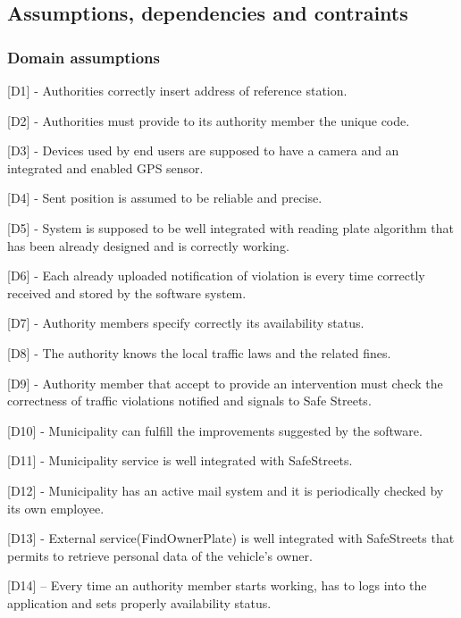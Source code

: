 \documentclass[12pt]{article}
\begin{document}
\subsection{Assumptions, dependencies and contraints}
\vspace{3mm}
\subsubsection{Domain assumptions}
\begin{flushleft}

[D1] - Authorities correctly insert address of reference station.
\vspace{2mm}

[D2] - Authorities must provide to its authority member the unique code.
\vspace{2mm}

[D3] - Devices used by end users are supposed to have a camera and an integrated and enabled GPS sensor.
\vspace{2mm}

[D4] - Sent position is assumed to be reliable and precise.
\vspace{2mm}

[D5] - System is supposed to be well integrated with reading plate algorithm that has been already designed and is correctly working.
\vspace{2mm}

[D6] - Each already uploaded notification of violation is every time correctly received and stored by the software system.
\vspace{2mm}

[D7] - Authority members specify correctly its availability status.
\vspace{2mm}

[D8] - The authority knows the local traffic laws and the related fines.
\vspace{2mm}

[D9] - Authority member that accept to provide an intervention must check the correctness of traffic violations notified and signals to Safe Streets.
\vspace{2mm}

[D10] - Municipality can fulfill the improvements suggested by the software.
\vspace{2mm}

[D11] - Municipality service is well integrated with SafeStreets.
\vspace{2mm}

[D12] - Municipality has an active mail system and it is periodically checked by its own employee.
\vspace{2mm}

[D13] - External service(FindOwnerPlate) is well integrated with SafeStreets that permits to retrieve personal data of the vehicle’s owner.
\vspace{2mm}

[D14] – Every time an authority member starts working, has to
logs into the application and sets properly availability status.
\vspace{2mm}

\end{flushleft}
\end{document}
